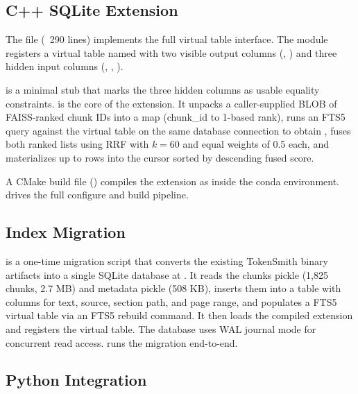 \documentclass[sigconf,11pt]{acmart}
\begin{document}
\subsection{C++ SQLite Extension}

The file  (~290 lines) implements the full
 virtual table interface. The module registers a virtual
table named  with two visible output columns
(, ) and three hidden input columns
(, , ).

 is a minimal stub that marks the three hidden columns as
usable equality constraints.  is the core of the extension. It
unpacks a caller-supplied BLOB of FAISS-ranked chunk IDs into a
 map (chunk\_id to 1-based rank), runs an FTS5 
query against the  virtual table on the same database
connection to obtain , fuses both ranked lists using RRF with
$k=60$ and equal weights of 0.5 each, and materializes up to  rows
into the cursor sorted by descending fused score.

A CMake build file () compiles the extension as
 inside the conda environment. 
drives the full configure and build pipeline.

\subsection{Index Migration}

 is a one-time migration script that converts the
existing TokenSmith binary artifacts into a single SQLite database at
. It reads the chunks pickle (1,825 chunks, 2.7 MB)
and metadata pickle (508 KB), inserts them into a  table with
columns for text, source, section path, and page range, and populates a
 FTS5 virtual table via an FTS5 rebuild command. It then loads
the compiled extension and registers the  virtual table.
The database uses WAL journal mode for concurrent read access.
 runs the migration end-to-end.

\subsection{Python Integration}
\end{document}
